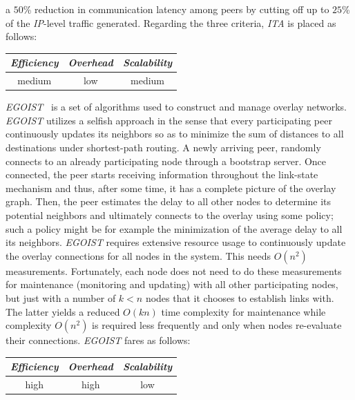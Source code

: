 a $50$\% reduction in communication latency among peers by cutting off up to 
$25$\% of the \emph{IP}-level traffic generated.
Regarding the three criteria, \emph{ITA} is placed as follows:
%
\begin{center}
{\footnotesize
\begin{tabular}{ccc}
\emph{Efficiency} & \emph{Overhead} & \emph{Scalability} \\
\hline
medium &
low &
medium
\end{tabular}
}
\end{center}

\emph{EGOIST}~\cite{SLLBBR2008} is a set of algorithms used 
to construct and manage overlay networks. 
\emph{EGOIST} utilizes a selfish approach in the sense that every participating
peer continuously updates its neighbors so as to minimize the sum of distances
to all destinations under shortest-path routing. 
A newly arriving peer, randomly connects to an already participating 
node through a bootstrap server. Once connected, the peer starts receiving
information throughout the link-state mechanism and thus, after some time, 
it has a complete picture of the overlay graph. 
Then, the peer estimates the delay to all other nodes to
determine its potential neighbors and ultimately connects 
to the overlay using some policy; such a policy might be 
for example the minimization of the average delay to all its
neighbors. 
\emph{EGOIST} requires extensive resource usage to continuously
update the overlay connections for all nodes in the system. This needs
$O(n^2)$ measurements. 
Fortunately, each node does not need to do these
measurements for maintenance (monitoring and updating) with all other
participating nodes, but just with a number of $k<n$ nodes that it chooses to
establish links with. 
The latter yields a reduced $O(kn)$ time complexity for
maintenance while complexity $O(n^2)$ is required less frequently 
and only when nodes re-evaluate their connections.
%
\emph{EGOIST} fares as follows:
\begin{center}
{\footnotesize
\begin{tabular}{ccc}
\emph{Efficiency} & \emph{Overhead} & \emph{Scalability} \\
\hline
high &
high &
low
\end{tabular}
}
\end{center}


